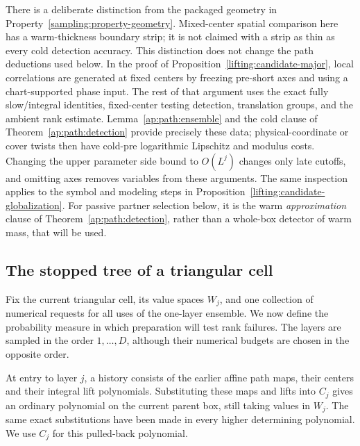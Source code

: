 There is a deliberate distinction from the packaged geometry in
Property~\ref{sampling:property-geometry}.  Mixed-center spatial
comparison here has a warm-thickness boundary strip; it is not
claimed with a strip as thin as every cold detection accuracy.
This distinction does not change the path deductions used below.
In the proof of Proposition~\ref{lifting:candidate-major}, local
correlations are generated at fixed centers by freezing pre-short
axes and using a chart-supported phase input.  The rest of that
argument uses the exact fully slow/integral identities,
fixed-center testing detection, translation groups, and the
ambient rank estimate.  Lemma~\ref{ap:path:ensemble} and the
cold clause of Theorem~\ref{ap:path:detection} provide precisely
these data; physical-coordinate or cover twists then have
cold-pre logarithmic Lipschitz and modulus costs.  Changing the
upper parameter side bound to $O(L^j)$ changes only late
cutoffs, and omitting axes removes variables from these arguments.
The same inspection applies to the symbol and modeling steps in
Proposition~\ref{lifting:candidate-globalization}.  For passive
partner selection below, it is the warm \emph{approximation}
clause of Theorem~\ref{ap:path:detection}, rather than a
whole-box detector of warm mass, that will be used.


\subsection{The stopped tree of a triangular cell}
\label{ap:path:stopped-tree}

Fix the current triangular cell, its value spaces $W_j$, and one
collection of numerical requests for all uses of the one-layer
ensemble.  We now define the probability measure in which preparation
will test rank failures.  The layers are sampled in the order
$1,\ldots,D$, although their numerical budgets are chosen in the
opposite order.

At entry to layer $j$, a history consists of the earlier affine path
maps, their centers and their integral lift polynomials.  Substituting
these maps and lifts into $C_j$ gives an ordinary polynomial on the
current parent box, still taking values in $W_j$.  The same exact
substitutions have been made in every higher determining polynomial.
We use $C_j$ for this pulled-back polynomial.

